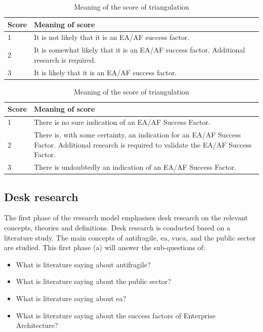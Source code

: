 \begin{table}[!h]
	\begin{center}
		\begin{tabular}{@{}p{}p{}@{}}
			\toprule
			Score 	& Meaning of score \\ \midrule
			1		& It is not likely that it is an EA/AF success factor. \\
			2    	& It is somewhat likely that it is an EA/AF success factor. Additional research is required.\\
			3    	& It is likely that it is an EA/AF success factor. \\ \bottomrule
		\end{tabular}
		\caption{Meaning of the score of triangulation}
		\label{tab:exampletriangulationscoring}
	\end{center}
\end{table}

\begin{table}[!h]
	\begin{center}
		\begin{tabular}{p{}p{}}
			\toprule
			Score 	& Meaning of score \\ \midrule
			1		& There is no sure indication of an EA/AF Success Factor. \\
			2    	& There is, with some certainty, an indication for an EA/AF Success Factor. Additional research is required to validate the EA/AF Success Factor. \\
			3    	& There is undoubtedly an indication of an EA/AF Success Factor. \\ \bottomrule
		\end{tabular}
		\caption{Meaning of the score of triangulation}
		\label{tab:oldexampletriangulationscoring}
	\end{center}
\end{table}


\subsection{Desk research}
\label{sub:deskresearchphase}
The first phase of the research model emphasises desk research on the relevant concepts, theories and definitions. Desk research is conducted based on a literature study. The main concepts of \gls{antifragile}, \acrshort{ea}, \acrshort{vuca}, and the public sector are studied. This first phase (a) will answer the sub-questions of:
\begin{itemize}
	\item{What is literature saying about \gls{antifragile}?}
	\item{What is literature saying about the public sector?}
	\item{What is literature saying about \acrlong{ea}?}
	\item{What is literature saying about the success factors of Enterprise Architecture?}
\end{itemize}

